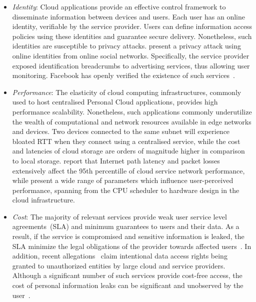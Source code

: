 \begin{itemize}
  \item{\it Identity}\/: Cloud applications provide an effective control
    framework to disseminate information between devices and users.  Each user
    has an online identity, verifiable by the service provider.
    Users can define information access policies using these identities and
    guarantee secure delivery. Nonetheless, such identities are susceptible  to
    privacy attacks.  present a privacy attack using
    online identities from online social networks. Specifically,
    the service provider exposed identification breadcrumbs to advertising
    services, thus allowing user monitoring.  Facebook has openly verified the
    existence of such services~.  

\item {\it Performance}\/: The elasticity of cloud computing infrastructures,
  commonly used to host centralised Personal Cloud applications, provides
  high performance scalability.  Nonetheless, such applications 
  commonly underutilize the wealth of computational and network resources
  available in edge networks and devices.  Two devices connected to the same
  subnet will experience bloated RTT when they connect using a centralised
  service, while the cost and latencies of cloud storage are orders of
  magnitude higher in comparison to local storage.  report
  that Internet path latency and packet losses extensively affect the 95th
  percentille of cloud service network performance, while  present
  a wide range of parameters which influence user-perceived performance,
  spanning from the CPU scheduler to hardware design in the cloud infrastructure.

\item {\it Cost}\/: 
  The majority of relevant services provide weak user service level
  agreements~(SLA) and minimum guarantees to users and their data. As a result,
  if the service is compromised and sensitive information is leaked, the SLA
  minimize the legal obligations of the provider towards affected
  users~. In addition, recent
  allegations~ claim intentional data access rights being
  granted to unauthorized entities by large cloud and service providers.
  Although a significant number of such services provide cost-free access, the
  cost of personal information leaks can be significant and unobserved by the
  user~.


\end{itemize}
